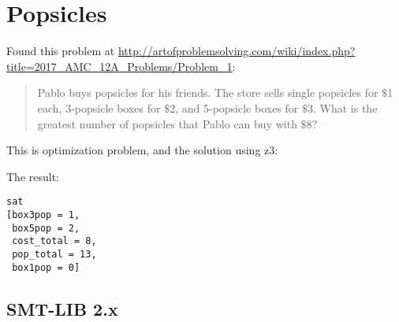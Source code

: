\section{Popsicles}
\label{popsicles}

Found this problem at \url{http://artofproblemsolving.com/wiki/index.php?title=2017_AMC_12A_Problems/Problem_1}:

\begin{framed}
\begin{quotation}

Pablo buys popsicles for his friends. The store sells single popsicles for $\$$1 each, 3-popsicle boxes for $\$$2,
and 5-popsicle boxes for $\$$3. What is the greatest number of popsicles that Pablo can buy with $\$$8?

\end{quotation}
\end{framed}

This is optimization problem, and the solution using z3:



The result:

\begin{lstlisting}
sat
[box3pop = 1,
 box5pop = 2,
 cost_total = 8,
 pop_total = 13,
 box1pop = 0]
\end{lstlisting}

\subsection{SMT-LIB 2.x}



